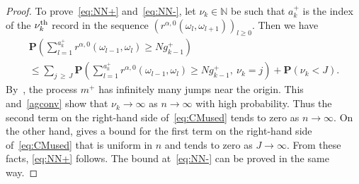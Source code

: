 \documentclass[10pt]{amsart}
\theoremstyle{definition}\newtheorem{defi}[theo]{Definition}\newtheorem{rema}[theo]{Remark}\newtheorem{exam}[theo]{Example}\newtheorem{exem}[theo]{Example}\newtheorem{nota}[theo]{Notation}
\newcommand{\N}{\mathbb N}
\newcommand{\bfP}{\mathbf{P}}
\begin{document}
\begin{proof}
To prove~\eqref{eq:NN+} and~\eqref{eq:NN-}, let $\nu_k\in \N$ be such that $a^+_k$ is the index of the $\nu_k^{\rm th}$ record in the sequence $(r^{\alpha,0}(\omega_l,\omega_{l+1}))_{l\ge 0}$. Then we have
\begin{multline}\label{eq:CMused}
\bfP\left({\textstyle \sum_{l=1}^{a_k^+}}r^{\alpha,0}\left(\omega_{l-1},\omega_{l}\right) \geq N g_{k-1}^+\right) \\
\le \sum_{j\,\ge\,J}\bfP\left({\textstyle \sum_{l=1}^{a_k^+}}r^{\alpha,0}\left(\omega_{l-1},\omega_{l}\right) \geq N g_{k-1}^+, \:\nu_k=j\right) + \bfP(\nu_k< J).
\end{multline}
By~\cite[Proposition~4.9]{Res87}, the process $m^+$ has infinitely many jumps near the origin. This and~\eqref{agconv} show that $\nu_k \to \infty$ as $n\to\infty$ with high probability. Thus the second term on the right-hand side of~\eqref{eq:CMused} tends to zero as $n\to\infty$. On the other hand, \cite[Lemma~3.8]{CM2} gives a bound for the first term on the right-hand side of~\eqref{eq:CMused} that is uniform in $n$ and tends to zero as $J\to\infty$. From these facts, \eqref{eq:NN+} follows. The bound at~\eqref{eq:NN-} can be proved in the same way.


\end{proof}
\end{document}

